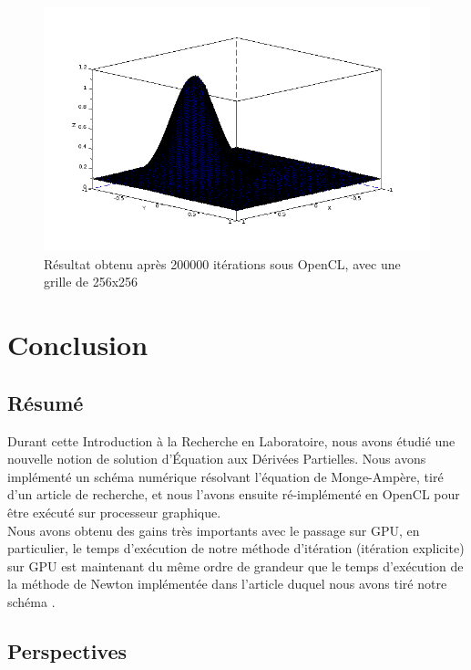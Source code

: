 \documentclass[12pt,a4paper,twoside]{article}
\begin{document}
\begin{figure}
\begin{center}
\includegraphics[scale=0.35]{Images/clres256.png}
\caption{Résultat obtenu après 200000 itérations sous OpenCL, avec une grille de 256x256}
\label{cl2}
\end{center}
\end{figure}


\newpage

\section{Conclusion}


\subsection{Résumé}

Durant cette Introduction à la Recherche en Laboratoire, nous avons étudié une nouvelle notion de solution d'Équation aux Dérivées Partielles. Nous avons implémenté un schéma numérique résolvant l'équation de
Monge-Ampère, tiré d'un article de recherche, et nous l'avons ensuite ré-implémenté en OpenCL pour être exécuté sur 
processeur graphique. \\

Nous avons obtenu des gains très importants avec le passage sur GPU, en particulier, le temps d'exécution de notre
méthode d'itération (itération explicite) sur GPU est maintenant du même ordre de grandeur que le temps 
d'exécution de la méthode de Newton implémentée dans l'article duquel nous avons tiré notre schéma \cite{benamou2014numerical}.

\subsection{Perspectives}
\end{document}
